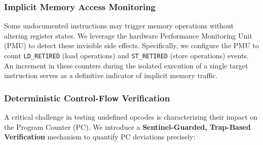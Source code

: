 \documentclass[pdflatex,sn-mathphys]{sn-jnl}%
\theoremstyle{thmstyleone}%
\theoremstyle{thmstyletwo}%
\theoremstyle{thmstylethree}%
\begin{document}
\subsubsection{Implicit Memory Access Monitoring}
Some undocumented instructions may trigger memory operations without altering register states. We leverage the hardware Performance Monitoring Unit (PMU) to detect these invisible side effects. Specifically, we configure the PMU to count \texttt{LD\_RETIRED} (load operations) and \texttt{ST\_RETIRED} (store operations) events. An increment in these counters during the isolated execution of a single target instruction serves as a definitive indicator of implicit memory traffic.

\subsubsection{Deterministic Control-Flow Verification}
\label{sec:cf_method}
A critical challenge in testing undefined opcodes is characterizing their impact on the Program Counter (PC). We introduce a \textbf{Sentinel-Guarded, Trap-Based Verification} mechanism to quantify PC deviations precisely:
\end{document}
